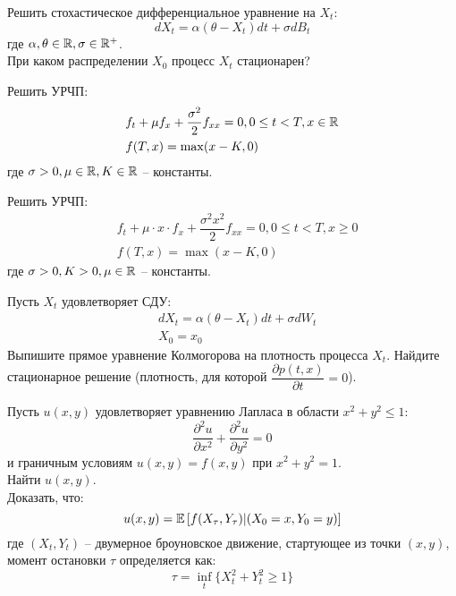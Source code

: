 \documentclass[12pt]{article}
\begin{document}
\begin{problem}
    Решить стохастическое дифференциальное уравнение на $X_t$:
    $$
        dX_t = \alpha (\theta -  X_t) dt + \sigma dB_t
    $$где $\alpha, \theta \in \mathbb{R}, \sigma \in \mathbb{R}^+$.
    \\
    При каком распределении $X_0$ процесс $X_t$ стационарен?
\end{problem}

\begin{problem}
    Решить УРЧП:
    \begin{align*}
        &f_t + \mu f_x + \dfrac{\sigma^2}{2} f_{xx} = 0, 0 \leq t < T, x \in \mathbb{R} \\
        &f(T, x) = \max(x - K, 0)
    \end{align*}
    где $\sigma > 0, \mu \in \mathbb{R}, K \in \mathbb{R}$ -- константы.
\end{problem}

\begin{problem}
    Решить УРЧП:
    \begin{align*}
        &f_t + \mu \cdot x \cdot f_x + \dfrac{\sigma^2 x^2}{2} f_{xx} = 0, 0 \leq t < T, x \geq 0 \\
        &f(T, x) = \max(x - K, 0)
    \end{align*}
    где $\sigma > 0, K > 0, \mu \in \mathbb{R}$ -- константы.
\end{problem}

\begin{problem}
    Пусть $X_t$ удовлетворяет СДУ:
    \begin{align}
        &dX_t = \alpha (\theta - X_t) dt + \sigma dW_t \\
        &X_0 = x_0
    \end{align}
    Выпишите прямое уравнение Колмогорова на плотность процесса $X_t$. Найдите стационарное решение (плотность, для которой $\dfrac{\partial p(t, x)}{\partial t} = 0$).
\end{problem}

\begin{problem}
    Пусть $u(x, y)$ удовлетворяет уравнению Лапласа в области $x^2+y^2 \leq 1$:
    $$
        \dfrac{\partial^2 u}{\partial x^2} + \dfrac{\partial^2 u}{\partial y^2} = 0 
    $$и граничным условиям $u(x, y) = f(x, y)$ при $x^2+y^2=1$. 
    \\ Найти $u(x, y)$.
    \\ Доказать, что:
    $$
        u(x, y) = \mathbb{E} \left[f(X_{\tau}, Y_{\tau}) | (X_0 = x, Y_0 = y)\right]
    $$где $(X_t, Y_t)$ -- двумерное броуновское движение, стартующее из точки $(x, y)$, момент остановки $\tau$ определяется как:
    $$
        \tau = \inf_{t} \{ X_t^2 + Y_t^2 \geq 1 \}
    $$
\end{problem}
\end{document}
